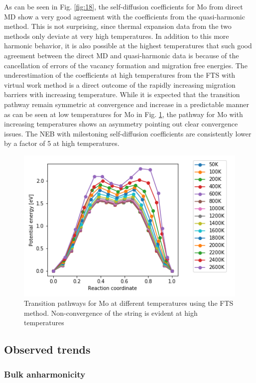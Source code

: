 \documentclass{article}
\begin{document}
As can be seen in Fig. \ref{fig:18}, the self-diffusion coefficients for Mo from direct MD show a very good agreement with the coefficients from the quasi-harmonic method. This is not surprising, since thermal expansion data from the two methods only deviate at very high temperatures. In addition to this more harmonic behavior, it is also possible at the highest temperatures that such good agreement between the direct MD and quasi-harmonic data is because of the cancellation of errors of the vacancy formation and migration free energies. The underestimation of the coefficients at high temperatures from the FTS with virtual work method is a direct outcome of the rapidly increasing migration barriers with increasing temperature. While it is expected that the transition pathway remain symmetric at convergence and increase in a predictable manner as can be seen at low temperatures for Mo in Fig. \ref{fig:19}, the pathway for Mo with increasing temperatures shows an asymmetry pointing out clear convergence issues. The NEB with milestoning self-diffusion coefficients are consistently lower by a factor of 5 at high temperatures.

\begin{figure}[!htp]
\centering
\includegraphics[scale=0.65]{migration_barriers}
\caption{Transition pathways for Mo at different temperatures using the FTS method. Non-convergence of the string is evident at high temperatures}
\label{fig:19}
\end{figure}

\subsection{Observed trends}

\subsubsection{Bulk anharmonicity}\label{bulk_anharm}
\end{document}
